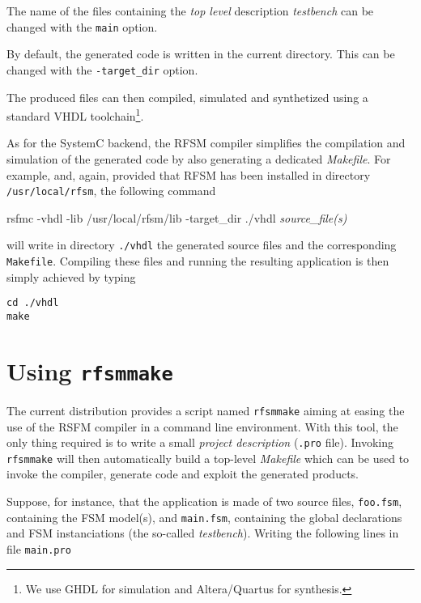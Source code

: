 \medskip The name of the files containing the \emph{top level} description \emph{testbench} can be
changed with the \verb|main| option.

\medskip
By default, the generated code is written in the current directory. This can be changed with the
\verb|-target_dir| option.

\medskip
The produced files can then compiled, simulated and synthetized using a standard VHDL
toolchain\footnote{We use GHDL for simulation and Altera/Quartus for synthesis.}.

\medskip
As for the SystemC backend, the RFSM compiler simplifies the compilation and simulation of the
generated code by also generating a dedicated \emph{Makefile}. For example,
and, again, provided that RFSM has been installed in directory \verb|/usr/local/rfsm|, the following
command

\begin{FVerbatim}[commandchars=\\\{\}]
rsfmc -vhdl -lib /usr/local/rfsm/lib -target_dir ./vhdl \emph{source_file(s)}
\end{FVerbatim}

will write in directory \verb|./vhdl| the generated source files and the corresponding
\verb|Makefile|. Compiling these files and running the resulting application is then simply achieved
by typing

\begin{verbatim}
cd ./vhdl
make 
\end{verbatim}

\section{Using \texttt{rfsmmake}}
\label{sec:rfsmmake}

The current distribution provides a script named \verb|rfsmmake| aiming at easing the use of the
RSFM compiler in a command line environment. With this tool, the only thing required is to write a
small \emph{project description} (\verb|.pro| file).
Invoking \verb|rfsmmake| will then
automatically build a top-level \emph{Makefile} which can be used to invoke the compiler, generate
code and exploit the generated products.

Suppose, for instance, that the application is made of two source files, \verb|foo.fsm|, containing the FSM model(s), and
\verb|main.fsm|, containing the global declarations and FSM instanciations (the so-called
\emph{testbench}). Writing the following lines in file \verb|main.pro|

